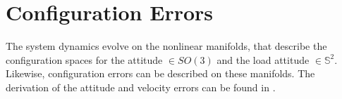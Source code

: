 \section{Configuration Errors}
The system dynamics evolve on the nonlinear manifolds, that describe the configuration spaces for the  attitude $ \in SO(3) $ and the load attitude $ \in \mathbb{S}^2 $. Likewise, configuration errors can be described on these manifolds. The derivation of the attitude and velocity errors can be found in \cite{Bullo2005}.
 


